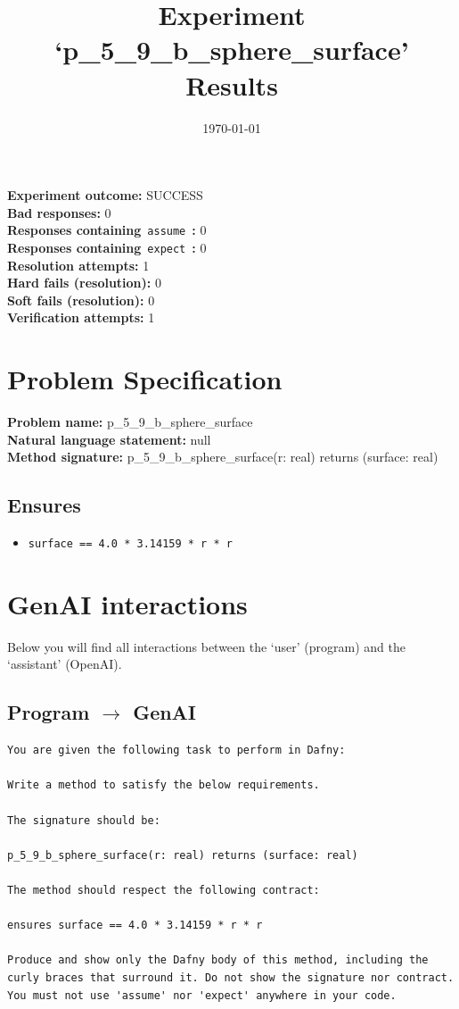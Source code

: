 \documentclass{article}
\begin{document}
\title{Experiment `p\_5\_9\_b\_sphere\_surface' Results}
\author{\today}
\date{}
\maketitle
\textbf{Experiment outcome: }SUCCESS
\\\textbf{Bad responses: }0
\\\textbf{Responses containing}~\texttt{assume}~\textbf{: }0
\\\textbf{Responses containing}~\texttt{expect}~\textbf{: }0
\\\textbf{Resolution attempts: }1
\\\textbf{Hard fails (resolution): }0
\\\textbf{Soft fails (resolution): }0
\\\textbf{Verification attempts: }1
\section*{Problem Specification}
\textbf{Problem name: }p\_5\_9\_b\_sphere\_surface
\\\textbf{Natural language statement: }null
\\\textbf{Method signature: }p\_5\_9\_b\_sphere\_surface(r: real) returns (surface: real)
\subsection*{Ensures}
\begin{itemize}
\item \texttt{surface == 4.0 * 3.14159 * r * r}
\end{itemize}
\clearpage
\section*{GenAI interactions}
Below you will find all interactions between the `user' (program) and the `assistant' (OpenAI).
\subsection*{Program $\rightarrow$ GenAI}
\begin{lstlisting}
You are given the following task to perform in Dafny:

Write a method to satisfy the below requirements.

The signature should be:

p_5_9_b_sphere_surface(r: real) returns (surface: real)

The method should respect the following contract:

ensures surface == 4.0 * 3.14159 * r * r

Produce and show only the Dafny body of this method, including the curly braces that surround it. Do not show the signature nor contract. You must not use 'assume' nor 'expect' anywhere in your code.
\end{lstlisting}
\end{document}

